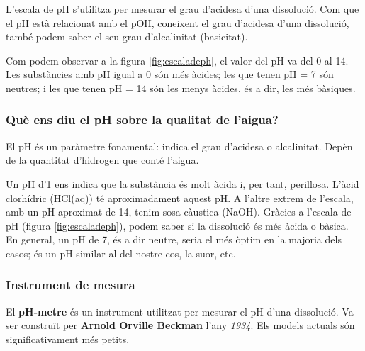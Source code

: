 L'escala de pH s'utilitza per mesurar el grau d'acidesa d'una dissolució. Com que el pH està relacionat amb el pOH, coneixent el grau d'acidesa d'una dissolució, també podem saber el seu grau d'alcalinitat (basicitat).%

Com podem observar a la figura \ref{fig:escaladeph}, el valor del pH va del 0 al 14. Les substàncies amb pH igual a 0 són més àcides; les que tenen pH = 7 són neutres; i les que tenen pH = 14 són les menys àcides, és a dir, les més bàsiques.


\subsubsection{Què ens diu el pH sobre la qualitat de l'aigua?}
El pH és un paràmetre fonamental: indica el grau d'acidesa o alcalinitat. Depèn de la quantitat d'hidrogen que conté l'aigua.

Un pH d'1 ens indica que la substància és molt àcida i, per tant, perillosa. L'àcid clorhídric (HCl(aq)) té aproximadament aquest pH. A l'altre extrem de l'escala, amb un pH aproximat de 14, tenim sosa càustica (NaOH). Gràcies a l'escala de pH (figura \ref{fig:escaladeph}), podem saber si la dissolució és més àcida o bàsica. En general, un pH de 7, és a dir neutre, seria el més òptim en la majoria dels casos; és un pH similar al del nostre cos, la suor, etc.


\subsubsection{Instrument de mesura}
El \textbf{pH-metre} és un instrument utilitzat per mesurar el pH d’una dissolució. Va ser construït per \textbf{Arnold Orville Beckman} l’any \textit{1934}. Els models actuals són significativament més petits.

